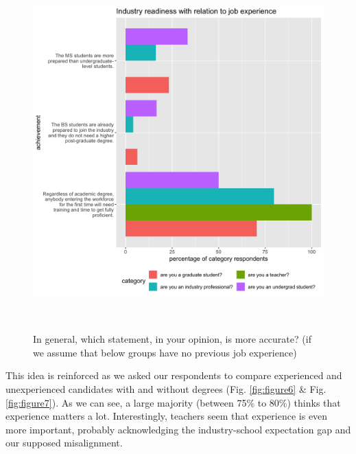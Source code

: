 \documentclass{sigchi}
\begin{document}
\begin{figure}
\includegraphics[scale=0.2]{../data-analysis/plots_output/Industry_readiness_with_relation_to_job_experience.png}
 \caption{In general, which statement, in your opinion, is more accurate? (if we assume that below groups have no previous job experience)}~\label{fig:figure5}
\end{figure}

This idea is reinforced as we asked our respondents to compare experienced and unexperienced candidates with and without degrees (Fig. \ref{fig:figure6} \& Fig. \ref{fig:figure7}). As we can see, a large majority (between 75\% to 80\%) thinks that experience matters a lot. Interestingly, teachers seem that experience is even more important, probably acknowledging the industry-school expectation gap and our supposed misalignment.
\end{document}
